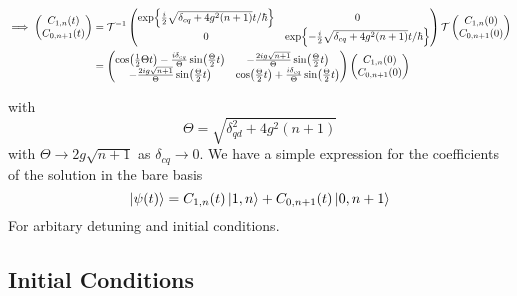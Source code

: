 \begin{widetext}
\begin{align*}
  \implies \begin{pmatrix}
              \mqty{C_{1, n}(t) \\ C_{0, n+1}(t)}
            \end{pmatrix} 
            &=\mathcal{T}^{-1} 
               \begin{pmatrix}
                 \mqty{\exp{\frac{i}{2}\sqrt{\delta_{cq}+4g^2(n+1)}t/\hbar} & 0 \\ 
                 0 & \exp{-\frac{i}{2}\sqrt{\delta_{cq}+4g^2(n+1)}t/\hbar} }
               \end{pmatrix}
   \mathcal{T}
   \begin{pmatrix}
      \mqty{C_{1, n}(0)\\C_{0, n+1}(0)}
   \end{pmatrix}\\
   &=\begin{pmatrix}
   \cos(\frac{1}{2}\Theta t) - \frac{i\delta_{cq}}{\Theta} \sin(\frac{\Theta}{2}t)& -\frac{2ig\sqrt{n+1}}{\Theta}\sin(\frac{\Theta}{2}t)\\
   -\frac{2ig\sqrt{n+1}}{\Theta} \sin(\frac{\Theta}{2}t) & \cos(\frac{\Theta}{2}t) + \frac{i\delta_{cq}}{\Theta}\sin(\frac{\Theta}{2}t) 
     \end{pmatrix}
     \begin{pmatrix}
      C_{1, n}(0)\\
      C_{0, n+1}(0)
     \end{pmatrix}
\end{align*}
\end{widetext}
with 
\begin{equation*}
  \Theta = \sqrt{\delta_{qd}^2 + 4g^2 (n+1)}
\end{equation*}
with $\Theta \rightarrow 2g\sqrt{n+1}$ as $\delta_{cq} \rightarrow 0$.
We have a simple expression for the coefficients of the solution in the bare basis 
\begin{equation}
  \ket{\psi(t)} = C_{1, n}(t) \ket{1, n} + C_{0, n+1}(t) \ket{0, n+1}
\end{equation}
For arbitary detuning and initial conditions. 

\subsection{Initial Conditions}
